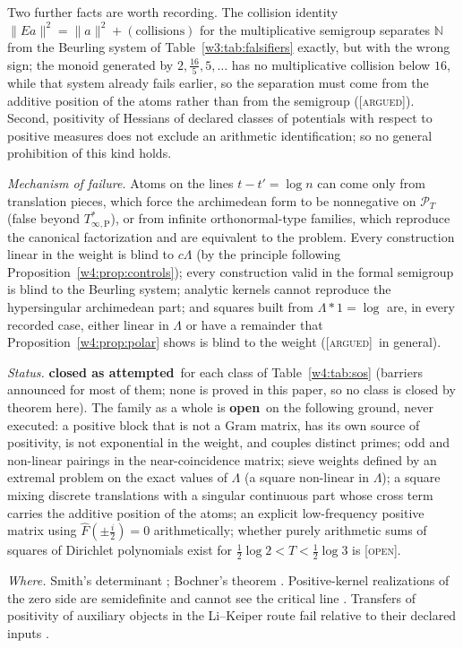 \documentclass[11pt]{amsart}
\theoremstyle{definition}
\theoremstyle{remark}
\numberwithin{equation}{section}
\newcommand{\N}{\mathbb{N}}
\newcommand{\Fh}{\widehat F}                           %
\newcommand{\PT}{\mathcal{P}_T}                        %
\newcommand{\Tarch}{T^{*}_{\infty,\mathrm P}}          %
\newcommand{\stag}[1]{\textsc{[#1]}}
\newcommand{\ARGUED}{\stag{argued}}
\newcommand{\OPENQ}{\stag{open}}
\newcommand{\rtag}[1]{\textbf{\small\textsf{#1}}}
\newcommand{\closedA}{\rtag{closed as attempted}}
\newcommand{\openR}{\rtag{open}}
\newcommand{\entry}[1]{\par\smallskip\noindent\textit{#1.}\enspace}
\begin{document}
Two further facts are worth recording. The collision identity $\|Ea\|^2=\|a\|^2+(\text{collisions})$ for the multiplicative semigroup
separates $\N$ from the Beurling system of Table~\ref{w3:tab:falsifiers} exactly, but with the wrong sign; the monoid generated by
$2,\frac{16}5,5,\dots$ has no multiplicative collision below $16$, while that system already fails earlier, so the separation must come
from the additive position of the atoms rather than from the semigroup (\ARGUED). Second, positivity of Hessians of declared classes
of potentials with respect to positive measures does not exclude an arithmetic identification; so no general prohibition of this kind holds.

\entry{Mechanism of failure} Atoms on the lines $t-t'=\log n$ can come only from translation pieces, which force the archimedean form
to be nonnegative on $\PT$ (false beyond $\Tarch$), or from infinite orthonormal-type families, which reproduce the canonical
factorization and are equivalent to the problem. Every construction linear in the weight is blind to $c\Lambda$
(by the principle following Proposition~\ref{w4:prop:controls}); every construction valid in the formal semigroup is blind to the Beurling system; analytic
kernels cannot reproduce the hypersingular archimedean part; and squares built from $\Lambda*1=\log$ are, in every recorded case, either linear in $\Lambda$ or
have a remainder that Proposition~\ref{w4:prop:polar} shows is blind to the weight (\ARGUED\ in general).

\entry{Status} \closedA\ for each class of Table~\ref{w4:tab:sos} (barriers announced for most of them; none is proved in this paper,
so no class is closed by theorem here). The family as a whole is \openR\ on the following ground, never executed: a positive block that
is not a Gram matrix, has its own source of positivity, is not exponential in the weight, and couples distinct primes; odd and
non-linear pairings in the near-coincidence matrix; sieve weights defined by an extremal problem on the exact values of $\Lambda$ (a
square non-linear in $\Lambda$); a square mixing discrete translations with a singular continuous part whose cross term carries the
additive position of the atoms; an explicit low-frequency positive matrix using $\Fh(\pm\frac i2)=0$ arithmetically; whether purely arithmetic sums of squares of Dirichlet polynomials exist for $\frac12\log2<T<\frac12\log3$ is \OPENQ.

\entry{Where} Smith's determinant \cite{Smith1876}; Bochner's theorem \cite{Bochner1932}. Positive-kernel realizations of the zero
side are semidefinite and cannot see the critical line \cite[Theorems~5.1--5.3]{P18}. Transfers of positivity of auxiliary objects in
the Li--Keiper route fail relative to their declared inputs \cite{P37}.
\end{document}
